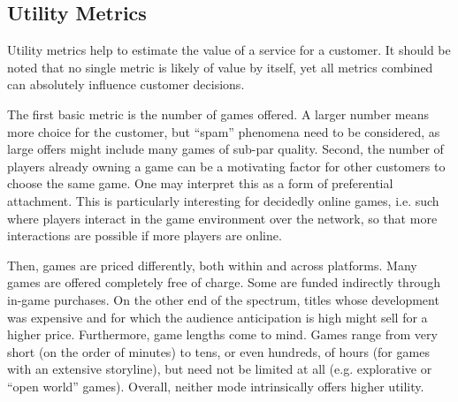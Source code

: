 

%


\subsection{Utility Metrics}

Utility metrics help to estimate the value of a service for a customer.
It should be noted that no single metric is likely of value by itself,
yet all metrics combined can absolutely influence customer decisions.

The first basic metric is the number of games offered. A larger number
means more choice for the customer, but ``spam'' phenomena need to
be considered, as large offers might include many games of sub-par quality.
Second, the number of players already owning a game can be a
motivating factor for other customers to choose the same game.
One may interpret this as a form of preferential attachment.
This is particularly interesting for decidedly online games, i.e.
such where players interact in the game environment over the network,
so that more interactions are possible if more players are online.

Then, games are priced differently, both within and across
platforms. Many games are offered completely free of charge.
Some are funded indirectly through in-game purchases. On the
other end of the spectrum, titles whose development was expensive
and for which the audience anticipation is high might sell
for a higher price. Furthermore, game lengths come to mind.
Games range from very short (on the order of minutes) to tens, or even
hundreds, of hours (for games with an extensive storyline),
but need not be limited at all (e.g. explorative or ``open world'' games).
Overall, neither mode intrinsically offers higher utility.

